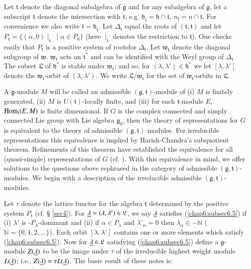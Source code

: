 Let $\mathfrak{t}$ denote the diagonal subalgebra of $\mathfrak{g}$
and for any subalgebra of $\mathfrak{g}$, let a subscript
$\mathfrak{t}$ denote the intersection with $\mathfrak{t}$;
e.g. $\mathfrak{h}_{\mathfrak{t}} = \mathfrak{h} \cap \mathfrak{t}$,
$n_{\mathfrak{t}} = n \cap \mathfrak{t}$. For convenience we also
write $\mathfrak{t} = \mathfrak{h}_{\mathfrak{t}}$. Let
$\Delta_{\mathfrak{t}}$ equal the roots of $(\mathfrak{t},
\mathfrak{t})$ and let $P_{\mathfrak{t}} = \{(\alpha, 0) \mid_{\mathfrak{t}} \;
\mid \alpha \in P_0\}$ (here $\mid_{\mathfrak{t}}$ denotes the
restriction to $\mathfrak{t}$). One checks easily that
$P_{\mathfrak{t}}$ is a positive system of roots\pageoriginale for
$\Delta_{\mathfrak{t}}$. Let $\mathfrak{w}_{\mathfrak{t}}$ denote the 
diagonal subgroup of $\mathfrak{w}$. $\mathfrak{w}_\mathfrak{t}$ acts
on $\mathfrak{t}^*$ and can be identified with the Weyl group of
$\Delta_\mathfrak{t}$. The subset $\mathfrak{L}$ of $\mathfrak{h}^*$
is stable under $\mathfrak{w}_\mathfrak{t}$; and so, for $(\lambda,
\lambda') \in \mathfrak{h}^*$ we let $[\lambda, \lambda']$ denote the
$\mathfrak{w}_\mathfrak{t}$-orbit of $(\lambda, \lambda')$. We write
$\mathfrak{L}/\mathfrak{w}_\mathfrak{t}$ for the set of
$\mathfrak{w}_\mathfrak{t}$-orbits in $\mathfrak{L}$.

A $\mathfrak{g}$-module $M$ will be called an admissible
$(\mathfrak{g}, \mathfrak{t})$-module of (i) $M$ is finitely
generated, (ii) $M$ is $U(\mathfrak{t})$-locally finite, and (iii) for
each $\mathfrak{t}$-module $E$, $\operatorname{Hom}_{\mathfrak{t}}(E,M)$ is finite
dimensional. If $G$ is the complex connected and simply connected Lie
group with Lie algebra $\mathfrak{g}_0$, then the theory of
representations for $G$ is equivalent to the theory of admissible
$(\mathfrak{g}, \mathfrak{t})$ modules. For irreducible
representations this equivalence is implied by Harish-Chandra's
subquotient theorem. Refinements of this theorem have established the
equivalence for all (quasi-simple) representations of $G$
(cf. \cite{key29}). With this equivalence in mind, we offer solutions
to the questions above rephrased in the category of admissible
$(\mathfrak{g}, \mathfrak{t})$-modules. We begin with a description of
the irreducible admissible $(\mathfrak{g}, \mathfrak{t})$-modules.

Let $\tau$ denote the lattice functor for the algebra $\mathfrak{t}$
determined by the positive system $P_\mathfrak{t}$ (cf. \S
\;\ref{sec4}). For $\underline{\lambda} = (\lambda, \lambda') \in
\mathfrak{L}$, we say $\underline{\lambda}$ satisfies (\ref{chap6:subsec6.5})
if (i) $\lambda'$ is -$P_\lambda$-dominant and (ii) if $\alpha \in
P_\lambda$ and $\lambda'_\alpha =0$ then $\lambda_\alpha \in -
\mathbb{N}$ ($\mathbb{N} = \{0,1,2, \ldots\}$). Each orbit $[\lambda,
  \lambda']$ contains one or more elements which satisfy
(\ref{chap6:subsec6.5}). Now for $\underline{\lambda} \in \mathfrak{L}$
satisfying (\ref{chap6:subsec6.5}) define a $\mathfrak{g}$-module $Z
(\underline{\lambda})$ to be the image under $\tau$ of the irreducible highest
weight module $L(\underline{\lambda})$; i.e., $Z(\underline{\lambda}) = \tau
L(\underline{\lambda})$. The basic result of these notes is:


